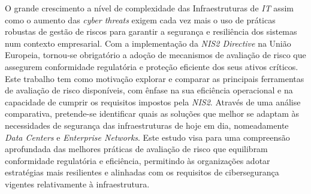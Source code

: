 
%

O grande crescimento a nível de complexidade das Infraestruturas de \textit{IT} assim como o aumento
das \textit{cyber threats} exigem cada vez mais o uso de práticas robustas de gestão de riscos para garantir
a segurança e resiliência dos sistemas num contexto empresarial. Com a implementação da \textit{NIS2
Directive} na União Europeia, tornou-se obrigatório a adoção de mecanismos de avaliação de risco
que assegurem conformidade regulatória e proteção eficiente dos seus ativos críticos.
Este trabalho tem como motivação explorar e comparar as principais ferramentas de avaliação de
risco disponíveis, com ênfase na sua eficiência operacional e na capacidade de cumprir os
requisitos impostos pela \textit{NIS2}. Através de uma análise comparativa, pretende-se identificar quais
as soluções que melhor se adaptam às necessidades de segurança das infraestruturas de hoje em
dia, nomeadamente \textit{Data Centers} e \textit{Enterprise Networks}. Este estudo visa para uma compreensão
aprofundada das melhores práticas de avaliação de risco que equilibram conformidade regulatória
e eficiência, permitindo às organizações adotar estratégias mais resilientes e alinhadas com os
requisitos de cibersegurança vigentes relativamente à infraestrutura.


